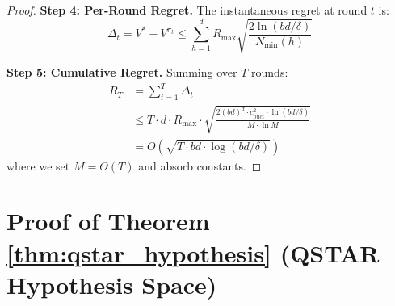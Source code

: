 \documentclass[11pt,a4paper]{article}
\begin{document}
\begin{proof}
\textbf{Step 4: Per-Round Regret.} The instantaneous regret at round $t$ is:
\begin{equation}
    \Delta_t = V^* - V^{\pi_t} \leq \sum_{h=1}^d R_{\max}\sqrt{\frac{2\ln(bd/\delta)}{N_{\min}(h)}}
\end{equation}

\textbf{Step 5: Cumulative Regret.} Summing over $T$ rounds:
\begin{align}
    R_T &= \sum_{t=1}^T \Delta_t \\
    &\leq T \cdot d \cdot R_{\max} \cdot \sqrt{\frac{2(bd)^d \cdot c_{\text{puct}}^2 \cdot \ln(bd/\delta)}{M \cdot \ln M}} \\
    &= O\left(\sqrt{T \cdot bd \cdot \log(bd/\delta)}\right)
\end{align}
where we set $M = \Theta(T)$ and absorb constants.
\end{proof}

\section{Proof of Theorem \ref{thm:qstar_hypothesis} (QSTAR Hypothesis Space)}
\end{document}
